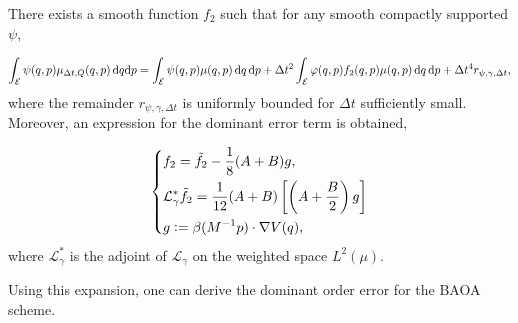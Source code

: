 \begin{theorem}
  \label{thm:baoab_error}
  There exists a smooth function $f_2$ such that for any smooth compactly supported $\psi$,

  \begin{equation}
    \label{BAOAB expansion}
   \int_{\mathcal E}\psi(q,p) \mu_{\Delta t,Q}(q,p) \,\mathrm{d} q \mathrm{d}p=\int_{\mathcal E}\psi(q,p)\mu(q,p)\,\mathrm{d}q\,\mathrm{d}p+\Delta t^2\int_{\mathcal E}\varphi(q,p) f_2(q,p)\mu(q,p)\,\mathrm{d}q\,\mathrm{d}p + \Delta t^4 r_{\psi,\gamma,\Delta t},
  \end{equation}
  where the remainder $r_{\psi,\gamma,\Delta t}$ is uniformly bounded for $\Delta t$ sufficiently small. Moreover, an expression for the dominant error term is obtained, 
  
  \begin{equation}
    \label{remainder term}
    \left\{\begin{aligned}
    &f_2=\tilde f_2-\frac18(A+B)g,\\
    &\mathcal L^{*}_\gamma\tilde f_2=\frac1{12}(A+B)\left[\left(A+\frac B2\right)g\right]\\
    &g\mathrel{\mathop:}=\beta(M^{-1}p)\cdot \nabla V(q),
    \end{aligned}\right.
  \end{equation}
  where $\mathcal L^*_\gamma$ is the adjoint of $\mathcal L_\gamma$ on the weighted space $L^2(\mu)$.  
\end{theorem}
Using this expansion, one can derive the dominant order error for the BAOA scheme.


